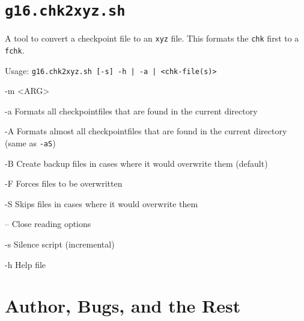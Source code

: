 \documentclass[   %
  final,          %
  a4paper,        %
  rscols=3,       %
  margin=1.0cm,   %
]{refsheet}
\begin{document}
\section{\texttt{g16.chk2xyz.sh}}

A tool to convert a checkpoint file to an \texttt{xyz} file. 
This formats the \texttt{chk} first to a \texttt{fchk}.

Usage: \texttt{g16.chk2xyz.sh [-s] -h | -a | <chk-file(s)>}

\begin{rslisttt}{-m <ARG>}
  \item[-a      ] Formats all checkpointfiles that are found in the current directory
  \item[-A      ] Formats almost all checkpointfiles that are found in the current directory (same as \texttt{-aS})
  \item[-B      ] Create backup files in cases where it would overwrite them (default)
  \item[-F      ] Forces files to be overwritten
  \item[-S      ] Skips files in cases where it would overwrite them
  \item[--      ] Close reading options
  \item[-s      ] Silence script (incremental)
  \item[-h      ] Help file 
\end{rslisttt}

\vfill
\section{Author, Bugs, and the Rest}

\end{document}
